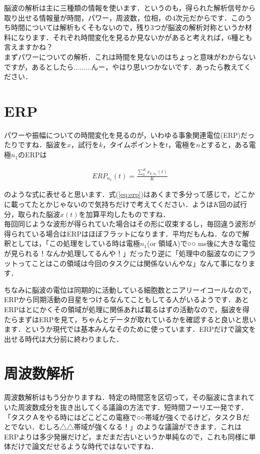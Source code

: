 \documentclass[11pt,a4paper]{ujreport} 	%
\begin{document}
脳波の解析は主に三種類の情報を使います．というのも，得られた解析信号から取り出せる情報量が時間，パワー，周波数，位相，の4次元だからです．このうち時間については解析もくそもないので，残り3つが脳波の解析対称というか材料になります．それぞれ時間変化を見るか見ないかがあると考えれば，6種とも言えますかね？\\

まずパワーについての解析．これは時間を見ないのはちょっと意味がわからないですが，あるとしたら.........んー，やはり思いつかないです．あったら教えてください．

\section{ERP}
パワーや振幅についての時間変化を見るのが，いわゆる事象関連電位(ERP)だったりですね．脳波を$x$，試行を$k$，タイムポイントを$t$，電極を$n$とすると，ある電極$n_1$のERPは

\begin{eqnarray}
  \label{eq:erp}
  ERP_{n_1}(t) = \frac{\sum_k^K x_{k,n_1}(t)}{K}
\end{eqnarray}

のような式に表せると思います．式(\ref{eq:erp})はあくまで多分って感じで，どこかに載ってたとかじゃないので気持ちだけで考えてください．ようは$K$回の試行分，取られた脳波$x(t)$を加算平均したものですね．\\

毎回同じような波形が得られていた場合はその形に収束するし，毎回違う波形が得られている場合はERPはほぼフラットになります．平均だもんね．なので解釈としては，「この処理をしている時は電極$n_1$(or 領域A)で○○ ms後に大きな電位が見られる！なんか処理してるんや！」だったり逆に「処理中の脳波なのにフラットってことはこの領域は今回のタスクには関係ないんやな」なんて事になります．

ちなみに脳波の電位は同期的に活動している細胞数とニアリーイコールなので，ERPから同期活動の目星をつけるなんてこともしてる人がいるようです．あとERPはとにかくその領域が処理に関係あれば載るはずの活動なので，脳波を得たらまずはERPを見て，ちゃんとデータが取れているかを確認すると良いと思います．というか現代では基本みんなそのために使っています．ERPだけで論文を出せる時代は大分前に終わりました．

\section{周波数解析}
周波数解析はもう分かりますね．特定の時間窓を区切って，その脳波に含まれていた周波数成分を抜き出してくる議論の方法です．短時間フーリエ一発です．「タスクＡをやる時にはどこどこの電極で○○帯域が強くでるけど，タスクＢだとでない．むしろ△△帯域が強くなる！」のような議論ができます．これはERPよりは多少発展だけど，まだまだ古いというか単純なので，これも同様に単体だけで論文だせるような時代ではないですね．
\end{document}

